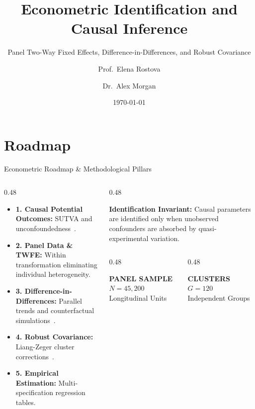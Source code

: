 \documentclass[aspectratio=169, 9pt]{beamer}
\title{Econometric Identification and Causal Inference}
\subtitle{Panel Two-Way Fixed Effects, Difference-in-Differences, and Robust Covariance}
\author{Prof.~Elena Rostova \and Dr.~Alex Morgan}
\institute{Department of Economics \& Institute for Empirical Research}
\date{\today}
\newcommand{\kpicard}[3]{%
  \begin{tcolorbox}[enhanced, colframe=structure!20, colback=structure!3, boxrule=0.5pt, arc=2pt,
    left=3pt, right=3pt, top=2.5pt, bottom=2.5pt, halign=center]
    {\fontsize{6pt}{7pt}\selectfont\bfseries\textcolor{structure}{#1}}\\[1pt]
    {\normalsize\bfseries\textcolor{accent}{#2}}\\[1pt]
    {\tiny\textcolor{structure!70}{#3}}
  \end{tcolorbox}%
}
\begin{document}
\begin{frame}[plain]
    \titlepage
\end{frame}

\section{Roadmap}
\begin{frame}{Econometric Roadmap \& Methodological Pillars}
    \begin{columns}[c]
        \begin{column}{0.48\textwidth}
            \par\vspace{0.3em}
            \begin{itemize}\setlength{\itemsep}{2.5pt}
                \item \textbf{1. Causal Potential Outcomes:} SUTVA and unconfoundedness~\cite{angrist1996identification}.
                \item \textbf{2. Panel Data \& TWFE:} Within transformation eliminating individual heterogeneity.
                \item \textbf{3. Difference-in-Differences:} Parallel trends and counterfactual simulations~\cite{callaway2021difference}.
                \item \textbf{4. Robust Covariance:} Liang-Zeger cluster corrections~\cite{wooldridge2010econometric}.
                \item \textbf{5. Empirical Estimation:} Multi-specification regression tables.
            \end{itemize}
        \end{column}
        \begin{column}{0.48\textwidth}
            \begin{takeaway}
                \textbf{\textcolor{accent}{Identification Invariant:}} Causal parameters are identified only when unobserved confounders are absorbed by quasi-experimental variation.
            \end{takeaway}
            \vspace{0.4em}
            \begin{columns}[c]
                \begin{column}{0.48\textwidth}
                    \kpicard{PANEL SAMPLE}{$N = 45{,}200$}{Longitudinal Units}
                \end{column}
                \begin{column}{0.48\textwidth}
                    \kpicard{CLUSTERS}{$G = 120$}{Independent Groups}
                \end{column}
            \end{columns}
        \end{column}
    \end{columns}
\end{frame}
\end{document}
